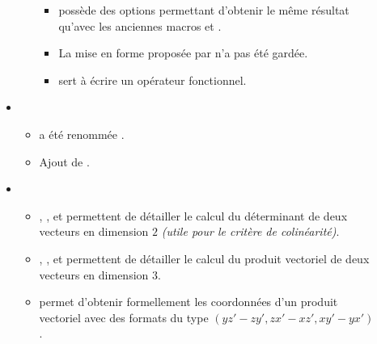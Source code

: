 \documentclass[12pt,a4paper]{article}
\begin{document}
\begin{description}
\begin{itemize}[itemsep=.5em]
\begin{itemize}[itemsep=.5em]
\begin{itemize}[itemsep=.5em, label=$\rightarrow$]
                \item {} possède des options permettant d'obtenir le même résultat qu'avec les anciennes macros  et .
    
                \item La mise en forme proposée par  n'a pas été gardée.
    
                \item {} sert à écrire un opérateur fonctionnel.
    	    \end{itemize}
        \end{itemize}
    
    
    
    
        \separation
        \item {}
        \begin{itemize}[itemsep=.5em]
            \item {} a été renommée .
    
            \item Ajout de .
        \end{itemize}
    
    
    
    
        \separation
        \item {}
        \begin{itemize}[itemsep=.5em]
            \item {}, ,  et  permettent de détailler le calcul du déterminant de deux vecteurs en dimension $2$ \emph{(utile pour le critère de colinéarité)}.
    
    
            \item {}, ,  et  permettent de détailler le calcul du produit vectoriel de deux vecteurs en dimension $3$.
    
            \item {} permet d'obtenir formellement les coordonnées d'un produit vectoriel avec des formats du type $(y z' - z y' , z x' - x z ' , x y' - y x')$.
    
    

\end{itemize}
\end{itemize}
\end{description}
\end{document}
